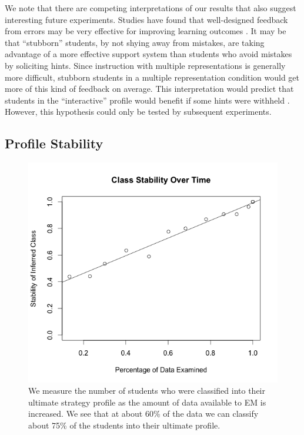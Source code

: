\documentclass{edm_template}
\begin{document}
We note that there are competing interpretations of our results that also suggest interesting future experiments. Studies have found that well-designed feedback from errors may be very effective for improving learning outcomes \cite{McKendree1990}. It may be that ``stubborn'' students, by not shying away from mistakes, are taking advantage of a more effective support system than students who avoid mistakes by soliciting hints. Since instruction with multiple representations is generally more difficult, stubborn students in a multiple representation condition would get more of this kind of feedback on average. This interpretation would predict that students in the ``interactive'' profile would benefit if some hints were withheld \cite{Koedinger2007}. However, this hypothesis could only be tested by subsequent experiments.

\subsection{Profile Stability}

\begin{figure}
\includegraphics[scale=.4]{class-stability.png}
\caption{We measure the number of students who were classified into their ultimate strategy profile as the amount of data available to EM is increased. We see that at about 60\% of the data we can classify about 75\% of the students into their ultimate profile.}
\label{fig:class-stability}
\end{figure}
\end{document}
